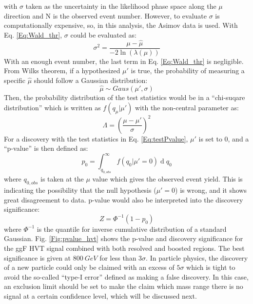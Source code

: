 with $\sigma$ taken as the uncertainty in the likelihood phase space along the $\mu$ direction and N is the observed event number. However, to evaluate $\sigma$ is computationally expensive, so, in this analysis, the Asimov data is used. With Eq. \ref{Eq:Wald_thr}, $\sigma$ could be evaluated as:
\begin{equation}
\sigma^2 = \frac{\mu-\hat{\mu}}{-2\ln(\lambda(\mu))}
\end{equation}
With an enough event number, the last term in Eq. \ref{Eq:Wald_thr} is negligible. From Wilks theorem, if a hypothesized $\mu'$ is true, the probability of measuring a specific $\hat{\mu}$ should follow a Gaussian distribution:
\begin{equation}
\hat{\mu}\sim Gaus(\mu',\sigma)
\end{equation}
Then, the probability distribution of the test statistics would be in a ``chi-suqare distribution'' which is written as $f(q_{\mu}|\mu')$ with the non-central parameter as:
\begin{equation}
\Lambda=(\frac{\mu-\mu'}{\sigma})^2
\end{equation}
For a discovery with the test statistics in Eq. \ref{Eq:testPvalue}, $\mu'$ is set to 0, and a ``p-value'' is then defined as:
\begin{equation}
p_{0}=\int_{q_{0,obs}}^{\infty}f(q_{0}|\mu'=0)\operatorname{d}q_{0}
\end{equation}	 
where $q_{0,obs}$ is taken at the $\mu$ value which gives the observed event yield. This is indicating the possibility that the null hypothesis ($\mu'=0$) is wrong, and it shows great disagreement to data. p-value would also be interpreted into the discovery significance:
\begin{equation}
Z=\Phi^{-1}(1-p_{0})
\end{equation}
where $\Phi^{-1}$ is the quantile for inverse cumulative distribution of a standard Gaussian. Fig. \ref{Fig:pvalue_hvt} shows the p-value and discovery significance for the ggF HVT signal combined with both resolved and boosted regions. The best significance is given at $800~GeV$ for less than $3\sigma$. In particle physics, the discovery of a new particle could only be claimed with an excess of $5\sigma$ which is tight to avoid the so-called ``type-I error'' defined as making a false discovery. In this case, an exclusion limit should be set to make the claim which mass range there is no signal at a certain confidence level, which will be discussed next. 

